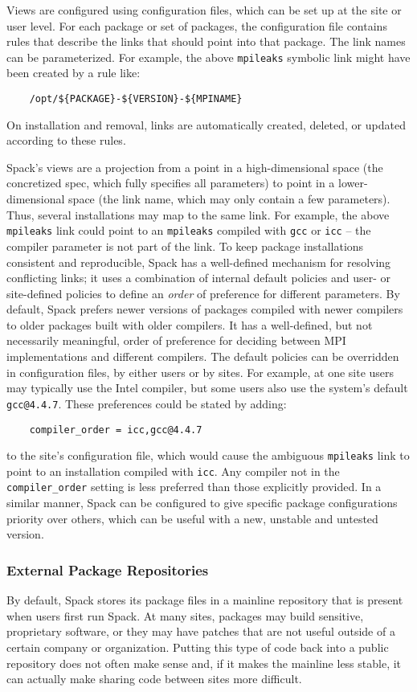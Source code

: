 Views are configured using configuration files, which can be set up at the site or
user level.
For each package or set of packages, the configuration file contains rules
that describe the links that should point into that package.
The link names can be parameterized.
For example, the above {\tt mpileaks} symbolic link might have been created by a rule like:
%
\begin{verbatim}
    /opt/${PACKAGE}-${VERSION}-${MPINAME}
\end{verbatim}
%
On installation and removal,
links are automatically created, deleted, or updated according to these rules.

Spack's views are a projection from a point in a high-dimensional space
(the concretized spec, which fully specifies all parameters) to point
in a lower-dimensional space
(the link name, which may only contain a few parameters).
Thus, several installations may map to the same link.
For example, the above {\tt mpileaks} link could point to an {\tt mpileaks} compiled with
{\tt gcc} or {\tt icc} -- the compiler parameter is not part of the link.
To keep  package installations consistent and reproducible,
Spack has a well-defined mechanism for resolving conflicting links;
it uses a combination of internal default policies and user- or site-defined
policies to define an {\it order} of preference for different parameters.
By default, Spack prefers newer versions of packages compiled with newer compilers
to older packages built with older compilers. It has a well-defined, but not
necessarily meaningful, order of preference for deciding between MPI
implementations and different compilers.
The default policies can be overridden in configuration files, by either users
or by sites. For example, at one site users may typically use the Intel compiler,
but some users also use the system's default {\tt gcc@4.4.7}.
These preferences could be stated by adding:
%
\begin{verbatim}
    compiler_order = icc,gcc@4.4.7
\end{verbatim}
%
to the site's configuration file, which would cause the ambiguous
{\tt mpileaks} link to point to an installation compiled with {\tt icc}.
Any compiler not in the {\tt compiler\_order} setting is less 
preferred than those explicitly provided.
%
In a similar manner, Spack can be configured to give specific package
configurations priority over others, which can be useful with a new, unstable 
and untested version.

\subsubsection{External Package Repositories}
By default, Spack stores its package files in a mainline repository
that is present when users
first run Spack.  At many sites, packages may build sensitive,
proprietary software, or they
may have patches that are not useful outside of a certain company or
organization.  Putting this type of code back into a public repository
does not often make sense and, if it makes the
mainline less stable, it can actually make sharing code between sites more difficult.

